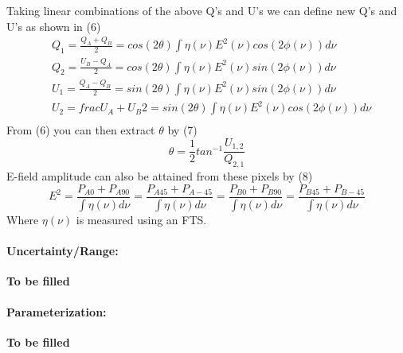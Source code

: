 Taking linear combinations of the above Q's and U's we can define new Q's and U's as shown in (6)
\begin{equation}
\begin{split}
&Q_1=\frac{Q_A+Q_B}{2}= cos(2\theta)\int \eta(\nu)E^2(\nu)cos(2\phi(\nu))d\nu \\
&Q_2 = \frac{U_B-Q_A}{2}= cos(2\theta)\int \eta(\nu)E^2(\nu)sin(2\phi(\nu))d\nu \\
&U_1 = \frac{Q_A-Q_B}{2}= sin(2\theta)\int \eta(\nu)E^2(\nu)sin(2\phi(\nu))d\nu \\
&U_2 =  frac{U_A+U_B}{2}= sin(2\theta)\int \eta(\nu)E^2(\nu)cos(2\phi(\nu))d\nu \\
\end{split}
\end{equation}
From (6) you can then extract $\theta$ by (7)
\begin{equation}
\theta=\frac{1}{2}tan^{-1}\frac{U_{1,2}}{Q_{2,1}}
\end{equation}
E-field amplitude can also be attained from these pixels by (8)
\begin{equation}
E^2=\frac{P_{A0}+P_{A90}}{\int\eta(\nu)d\nu}=\frac{P_{A45}+P_{A-45}}{\int\eta(\nu)d\nu}=\frac{P_{B0}+P_{B90}}{\int\eta(\nu)d\nu}=\frac{P_{B45}+P_{B-45}}{\int\eta(\nu)d\nu}
\end{equation}
Where $\eta(\nu)$ is measured using an FTS.

\paragraph{Uncertainty/Range:}
\textbf{To be filled}

\paragraph{Parameterization:}
\textbf{To be filled}

